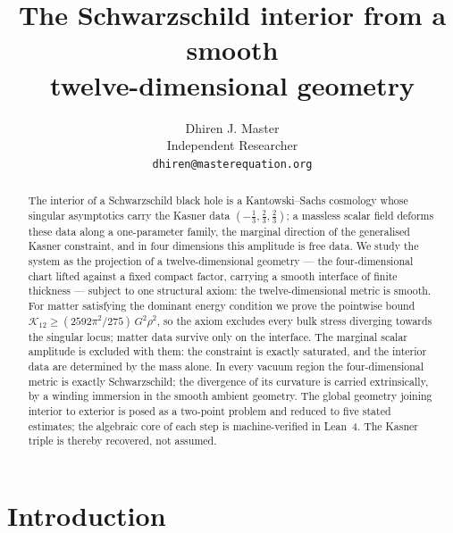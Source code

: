 \documentclass[11pt]{article}
\title{The Schwarzschild interior from a smooth\\ twelve-dimensional
geometry}
\author{Dhiren J. Master\\[2pt]
\normalsize Independent Researcher\\[1pt]
\normalsize \texttt{dhiren@masterequation.org}}
\date{}
\numberwithin{equation}{section}
\theoremstyle{plain}
\theoremstyle{definition}
\theoremstyle{remark}
\newcommand{\Kr}{\mathcal{K}}
\newcommand{\Geff}{G}
\begin{document}
\maketitle

\begin{abstract}
\noindent
The interior of a Schwarzschild black hole is a Kantowski--Sachs
cosmology whose singular asymptotics carry the Kasner data
$(-\tfrac13, \tfrac23, \tfrac23)$; a massless scalar field deforms
these data along a one-parameter family, the marginal direction of the
generalised Kasner constraint, and in four dimensions this amplitude is
free data. We study the system as the projection of a
twelve-dimensional geometry --- the four-dimensional chart lifted
against a fixed compact factor, carrying a smooth interface of finite
thickness --- subject to one structural axiom: the twelve-dimensional
metric is smooth. For matter satisfying the dominant energy condition
we prove the pointwise bound
$\Kr_{12} \geq (2592\pi^{2}/275)\, \Geff^{2}\rho^{2}$, so the axiom
excludes every bulk stress diverging towards the singular locus; matter
data survive only on the interface. The marginal scalar amplitude is
excluded with them: the constraint is exactly saturated, and the
interior data are determined by the mass alone. In every vacuum region
the four-dimensional metric is exactly Schwarzschild; the divergence of
its curvature is carried extrinsically, by a winding immersion in the
smooth ambient geometry. The global geometry joining interior to
exterior is posed as a two-point problem and reduced to five stated
estimates; the algebraic core of each step is machine-verified in
Lean~4. The Kasner triple is thereby recovered, not assumed.
\end{abstract}

\section{Introduction}\label{sec:intro}
\end{document}
